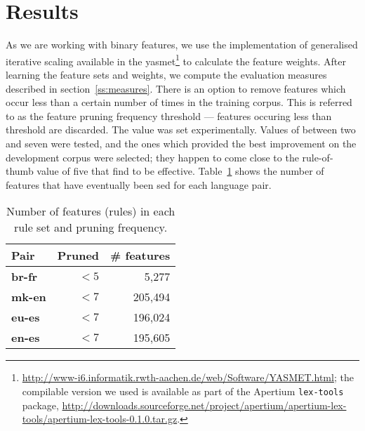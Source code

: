 \documentclass[11pt]{article}
\begin{document}
\section{Results}
\label{sec:eval-ref-results}

As we are working with binary features, we use the implementation of
generalised iterative scaling available in the {\sc
  yasmet}\footnote{\url{http://www-i6.informatik.rwth-aachen.de/web/Software/YASMET.html};
  the compilable version we used is available as part of the Apertium
  \texttt{lex-tools} package,
  \url{http://downloads.sourceforge.net/project/apertium/apertium-lex-tools/apertium-lex-tools-0.1.0.tar.gz}.}
to calculate the feature weights.  After learning the feature sets and
weights, we compute the evaluation measures described in
section~\ref{ss:measures}. There is an option to remove features which
occur less than a certain number of times in the training corpus. This
is referred to as the feature pruning frequency threshold --- features
occuring less than threshold are discarded. The value was set
experimentally. Values of between two and seven were tested, and the
ones which provided the best improvement on the development corpus
were selected; they happen to come close to the rule-of-thumb value of
five that \citet[p.~596]{Manning99b} find to be effective.
Table~\ref{table:maxent-features} shows the number of features that
have eventually been sed for each language pair.


\begin{table}
 \begin{center}
    \begin{tabular}{|l|r|r|}
        \hline
        \textbf{Pair} & \textbf{Pruned} & \textbf{\# features} \\\hline
        \hline
        {\bf br-fr}  & $< 5$              & 5,277    \\ 
        \hline
        {\bf mk-en} & $< 7$              & 205,494 \\ 
        \hline
        {\bf eu-es} & $< 7$              & 196,024\\
        \hline
        {\bf en-es} & $< 7$              & 195,605\\
        \hline
    \end{tabular}
 \end{center}
 \caption{Number of features (rules) in each rule set and pruning frequency.}
 \label{table:maxent-features}
\end{table}
\end{document}

